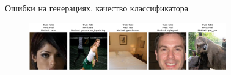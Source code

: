\documentclass[aspectratio=169]{beamer}
\begin{document}
\begin{frame}{Ошибки на генерациях, качество классификатора}
\begin{figure}
\centering
\includegraphics[width=0.76\textwidth]{figs/fake_images.png}
\end{figure}

\begin{figure}[ht]
    \centering
    \begin{minipage}{0.10\textwidth}

\end{minipage}
\end{figure}
\end{frame}
\end{document}
